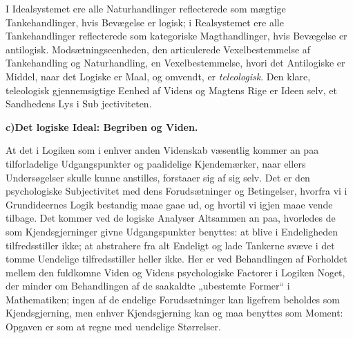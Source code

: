 \documentclass[12pt]{book}
\newcommand{\opage}[1]{\marginnote{\footnotesize\textit{[#1]}}}
\begin{document}
I Idealsystemet ere alle Naturhandlinger reflecterede som mægtige Tankehandlinger, hvis Bevægelse
er logisk; i Realsystemet ere alle Tankehandlinger reflecterede som kategoriske Magthandlinger,
hvis Bevægelse er antilogisk. Modsætningseenheden, den articulerede Vexelbestemmelse af
Tankehandling og Naturhandling, en Vexelbestemmelse, hvori det Antilogiske er Middel, naar det
Logiske er Maal, og omvendt, er \emph{teleologisk}. Den klare, teleologisk gjennemsigtige Eenhed af
Videns og Magtens Rige er Ideen selv, et Sandhedens Lys i Sub%
\opage{230} jectiviteten.

\begin{center}
{\bfseries c)\quad Det logiske Ideal: Begriben og Viden.}
\end{center}

At det i Logiken som i enhver anden Videnskab væsentlig kommer an paa tilforladelige
Udgangspunkter og paalidelige Kjendemærker, naar ellers Undersøgelser skulle kunne anstilles,
forstaaer sig af sig selv. Det er den psychologiske Subjectivitet med dens Forudsætninger og
Betingelser, hvorfra vi i Grundideernes Logik bestandig maae gaae ud, og hvortil vi igjen maae
vende tilbage. Det kommer ved de logiske Analyser Altsammen an paa, hvorledes de som
Kjendsgjerninger givne Udgangspunkter benyttes: at blive i Endeligheden tilfredsstiller ikke; at
abstrahere fra alt Endeligt og lade Tankerne svæve i det tomme Uendelige tilfredsstiller heller
ikke. Her er ved Behandlingen af Forholdet mellem den fuldkomne Viden og Videns psychologiske
Factorer i Logiken Noget, der minder om Behandlingen af de saakaldte „ubestemte Former“ i
Mathematiken; ingen af de endelige Forudsætninger kan ligefrem beholdes som Kjendsgjerning, men
enhver Kjendsgjerning kan og maa benyttes som Moment: Opgaven er som at regne med uendelige
Størrelser.
\end{document}
